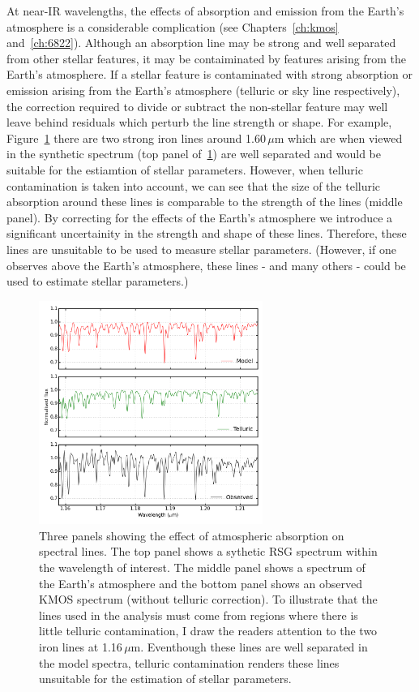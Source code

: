 At near-IR wavelengths, the effects of absorption and emission from the Earth's atmosphere is a considerable complication (see Chapters~\ref{ch:kmos} and~\ref{ch:6822}).
Although an absorption line may be strong and well separated from other stellar features, it may be contaiminated by features arising from the Earth's atmosphere.
If a stellar feature is contaminated with strong absorption or emission arising from the Earth's atmosphere (telluric or sky line respectively), the correction required to divide or subtract the non-stellar feature may well leave behind residuals which perturb the line strength or shape.
For example, Figure~\ref{fig:Felines} there are two strong iron lines around 1.60\,$\mu$m which are when viewed in the synthetic spectrum (top panel of~\ref{fig:Felines}) are well separated and would be suitable for the estiamtion of stellar parameters.
However, when telluric contamination is taken into account, we can see that the size of the telluric absorption around these lines is comparable to the strength of the lines (middle panel).
By correcting for the effects of the Earth's atmosphere we introduce a significant uncertainity in the strength and shape of these lines.
Therefore, these lines are unsuitable to be used to measure stellar parameters. (However, if one observes above the Earth's atmosphere, these lines - and many others - could be used to estimate stellar parameters.)

\begin{figure}
 \centering
\includegraphics[width=0.65\textwidth]{JAnal/tell-correction}
\caption{
Three panels showing the effect of atmospheric absorption on spectral lines.
The top panel shows a sythetic RSG spectrum within the wavelength of interest.
The middle panel shows a spectrum of the Earth's atmosphere and
the bottom panel shows an observed KMOS spectrum (without telluric correction).
To illustrate that the lines used in the analysis must come from regions where there is little telluric contamination, I draw the readers attention to the two iron lines at 1.16\,$\mu$m.
Eventhough these lines are well separated in the model spectra, telluric contamination renders these lines unsuitable for the estimation of  stellar parameters.
\label{fig:Felines}
         }
\end{figure}

